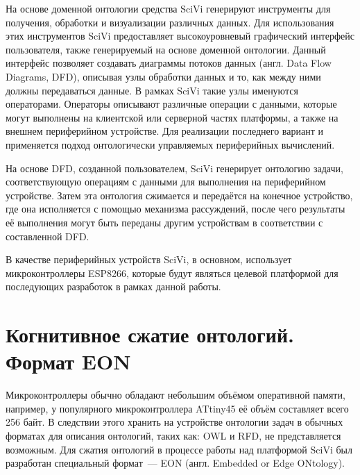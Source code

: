 На основе доменной онтологии средства SciVi генерируют инструменты для получения, обработки и визуализации различных данных.
Для использования этих инструментов SciVi предоставляет высокоуровневый графический интерфейс пользователя, также генерируемый на основе доменной онтологии.
Данный интерфейс позволяет создавать диаграммы потоков данных (англ. Data Flow Diagrams, DFD), описывая узлы обработки данных и то, как между ними должны передаваться данные.
В рамках SciVi такие узлы именуются операторами.
Операторы описывают различные операции с данными, которые могут выполнены на клиентской или серверной частях платформы, а также на внешнем периферийном устройстве.
Для реализации последнего вариант и применяется подход онтологически управляемых периферийных вычислений.

На основе DFD, созданной пользователем, SciVi генерирует онтологию задачи, соответствующую операциям с данными для выполнения на периферийном устройстве.
Затем эта онтология сжимается и передаётся на конечное устройство, где она исполняется с помощью механизма рассуждений, после чего результаты её выполнения могут быть переданы другим устройствам в соответствии с составленной DFD.

В качестве периферийных устройств SciVi, в основном, использует микроконтроллеры ESP8266, которые будут являться целевой платформой для последующих разработок в рамках данной работы.

\section{Когнитивное сжатие онтологий. Формат EON}

Микроконтроллеры обычно обладают небольшим объёмом оперативной памяти, например, у популярного микроконтроллера ATtiny45 её объём составляет всего 256 байт.
В следствии этого хранить на устройстве онтологии задач в обычных форматах для описания онтологий, таких как: OWL и RFD, не представляется возможным.
Для сжатия онтологий в процессе работы над платформой SciVi был разработан специальный формат~--- EON (англ. Embedded or Edge ONtology).

